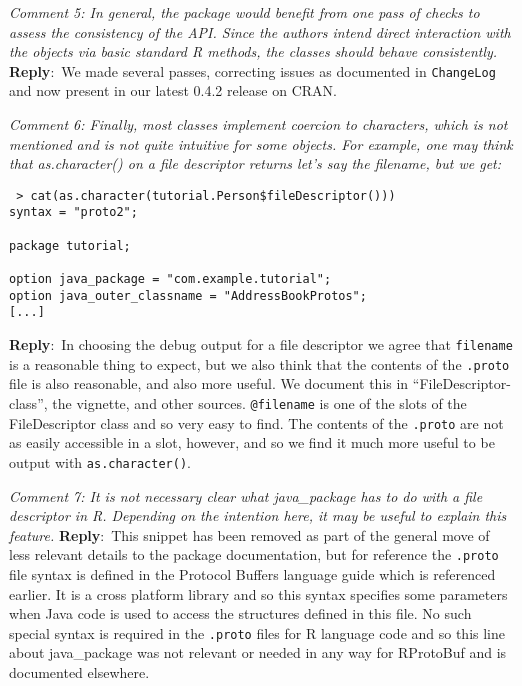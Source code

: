 \documentclass[10pt]{article}
\newcommand{\pointRaised}[2]{\smallskip %
  \textsl{{\fontseries{b}\selectfont #1}: #2}\newline}
\newcommand{\reply}[1]{\textbf{Reply}:\ #1 \smallskip } %
\begin{document}
\pointRaised{Comment 5}{In general, the package would benefit from one pass of checks to assess
  the consistency of the API. Since the authors intend direct interaction
  with the objects via basic standard R methods, the classes should behave 
  consistently.}
\reply{We made several passes, correcting issues as documented in
  \texttt{ChangeLog} and now present in our latest 0.4.2 release on CRAN.}

\pointRaised{Comment 6}{Finally, most classes implement coercion to characters, which is not 
  mentioned and is not quite intuitive for some objects. For example, one
  may think that as.character() on a file descriptor returns let's say the 
  filename, but we get:}

\begin{verbatim}
 > cat(as.character(tutorial.Person$fileDescriptor()))
syntax = "proto2";

package tutorial;

option java_package = "com.example.tutorial";
option java_outer_classname = "AddressBookProtos";
[...]
\end{verbatim}
\reply{In choosing the debug output for a file descriptor we agree
  that \texttt{filename} is a reasonable thing to expect, but we also
  think that the contents of the \texttt{.proto} file is also
  reasonable, and also more useful.  We document this in
  ``FileDescriptor-class'', the vignette, and other sources.
  \texttt{@filename} is one of the slots of the FileDescriptor class
  and so very easy to find.  The contents of the \texttt{.proto} are
  not as easily accessible in a slot, however, and so we find it much
  more useful to be output with \texttt{as.character()}.}

\pointRaised{Comment 7}{It is not necessary clear what java\_package has to do with a file 
  descriptor in R. Depending on the intention here, it may be useful to 
  explain this feature.
}
\reply{This snippet has been removed as part of the general move of
  less relevant details to the package documentation, but for
  reference the \texttt{.proto} file syntax is defined in the Protocol Buffers
  language guide which is referenced earlier. It is a cross platform
  library and so this syntax specifies some parameters when Java code
  is used to access the structures defined in this file.  No such
  special syntax is required in the \texttt{.proto} files for R
  language code and so this line about java\_package was not relevant
  or needed in any way for RProtoBuf and is documented elsewhere.}
\end{document}
